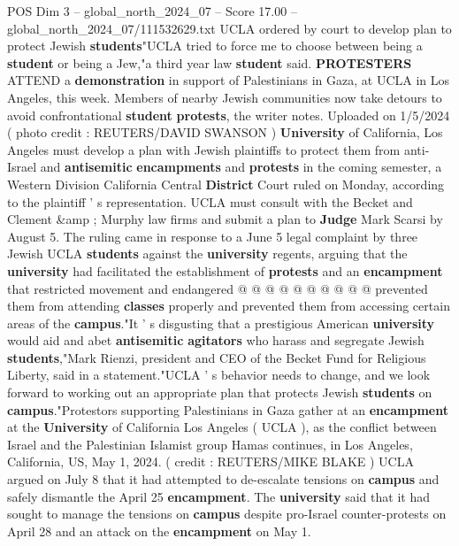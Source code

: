 \begin{textsample}{POS Dim 3 – global\_north\_2024\_07 – Score 17.00 – global\_north\_2024\_07/111532629.txt}  \label{ex:f3_pos_086}
UCLA ordered by court to develop plan to protect Jewish \textbf{students}"UCLA tried to force me to choose between being a \textbf{student} or being a Jew,"a third year law \textbf{student} said. \textbf{PROTESTERS} ATTEND a \textbf{demonstration} in support of Palestinians in Gaza, at UCLA in Los Angeles, this week.
Members of nearby Jewish communities now take detours to avoid confrontational \textbf{student} \textbf{protests}, the writer notes.
Uploaded on 1/5/2024 ( photo credit : REUTERS/DAVID SWANSON ) \textbf{University} of California, Los Angeles must develop a plan with Jewish plaintiffs to protect them from anti-Israel and \textbf{antisemitic} \textbf{encampments} and \textbf{protests} in the coming semester, a Western Division California Central \textbf{District} Court ruled on Monday, according to the plaintiff ' s representation.
UCLA must consult with the Becket and Clement \&amp ; Murphy law firms and submit a plan to \textbf{Judge} Mark Scarsi by August 5.
The ruling came in response to a June 5 legal complaint by three Jewish UCLA \textbf{students} against the \textbf{university} regents, arguing that the \textbf{university} had facilitated the establishment of \textbf{protests} and an \textbf{encampment} that restricted movement and endangered @ @ @ @ @ @ @ @ @ @ prevented them from attending \textbf{classes} properly and prevented them from accessing certain areas of the \textbf{campus}."It ' s disgusting that a prestigious American \textbf{university} would aid and abet \textbf{antisemitic} \textbf{agitators} who harass and segregate Jewish \textbf{students},"Mark Rienzi, president and CEO of the Becket Fund for Religious Liberty, said in a statement."UCLA ' s behavior needs to change, and we look forward to working out an appropriate plan that protects Jewish \textbf{students} on \textbf{campus}."Protestors supporting Palestinians in Gaza gather at an \textbf{encampment} at the \textbf{University} of California Los Angeles ( UCLA ), as the conflict between Israel and the Palestinian Islamist group Hamas continues, in Los Angeles, California, US, May 1, 2024. ( credit : REUTERS/MIKE BLAKE ) UCLA argued on July 8 that it had attempted to de-escalate tensions on \textbf{campus} and safely dismantle the April 25 \textbf{encampment}.
The \textbf{university} said that it had sought to manage the tensions on \textbf{campus} despite pro-Israel counter-protests on April 28 and an attack on the \textbf{encampment} on May 1.

\end{textsample}
